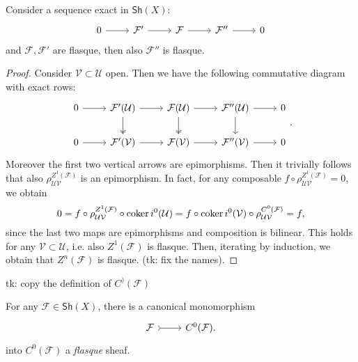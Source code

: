 \documentclass[../Main]{subfiles}
\begin{document}
\begin{cor}
	Consider a sequence exact in $\mathsf{Sh}\left(X\right)$:
	\begin{equation}
	\begin{tikzcd}
		0 \arrow[r, "", rightarrow] &
		\mathcal{F}' \arrow[r, "", rightarrow] &
		\mathcal{F} \arrow[r, "", rightarrow] &
		\mathcal{F}'' \arrow[r, "", rightarrow] &
		0
	\end{tikzcd}
	\end{equation} 
	and $\mathcal{F}, \mathcal{F}'$ are flasque, then also $\mathcal{F}''$ is flasque.
\end{cor} 
\begin{proof}
	Consider $\mathcal{V} \subset \mathcal{U}$ open.
	Then we have the following commutative diagram with exact rows:
	\begin{equation}
	\begin{tikzcd}
		0 \arrow[r, "", rightarrow] &
		\mathcal{F}'(\mathcal{U}) \arrow[d, "", twoheadrightarrow] 
		\arrow[r, "", rightarrow] &
		\mathcal{F}(\mathcal{U}) \arrow[d, "", twoheadrightarrow] 
		\arrow[r, "", rightarrow] &
		\mathcal{F}''(\mathcal{U}) \arrow[d, "", rightarrow] 
		\arrow[r, "", rightarrow] &
		0\\
		0 \arrow[r, "", rightarrow] &
		\mathcal{F}'(\mathcal{V}) \arrow[r, "", rightarrow] &
		\mathcal{F}(\mathcal{V}) \arrow[r, "", rightarrow] &
		\mathcal{F}''(\mathcal{V}) \arrow[r, "", rightarrow] &
		0
	\end{tikzcd}
	.\end{equation} 
Moreover the first two vertical arrows are epimorphisms.
		Then it trivially follows that also $\rho^{Z^1(\mathcal{F})}_{\mathcal{UV}}$
		is an epimorphism. In fact, for any
		composable $f \circ \rho^{Z^1(\mathcal{F})}_{\mathcal{UV}} = 0$,
		we obtain
		\begin{equation}
			0 = f \circ \rho^{Z^1(\mathcal{F})}_{\mathcal{UV}} \circ \operatorname{coker} i^0(\mathcal{U}) =
			f \circ \operatorname{coker} i^0(\mathcal{V}) \circ \rho^{C^0(\mathcal{F})}_{\mathcal{UV}}
			= f
		,\end{equation} 
		since the last two maps are epimorphisms and composition is bilinear.
		This holds for any $\mathcal{V} \subset \mathcal{U}$, i.e.
		also $Z^1(\mathcal{F})$ is flasque.
		Then, iterating by induction, we obtain that $Z^n(\mathcal{F})$ is flasque.
		(tk: fix the names).
\end{proof}
tk: copy the definition of $C^)(\mathcal{F})$
\begin{prop}[]
	For any $\mathcal{F} \in \mathsf{Sh}\left(X\right)$, there is a canonical
	monomorphism
	\begin{equation}
	\begin{tikzcd}
		\mathcal{F} \arrow[r, "", rightarrowtail] &
		C^0(\mathcal{F}).
	\end{tikzcd}
	\end{equation} 
	into $C^0(\mathcal{F})$ a {\em flasque} sheaf.
\end{prop}
\end{document}
